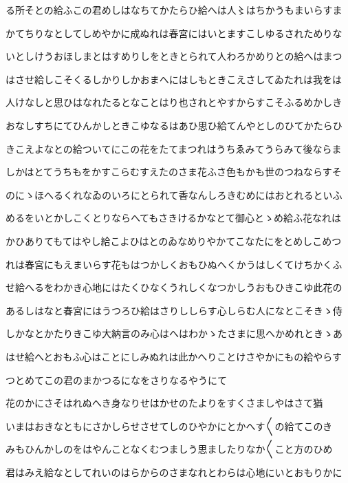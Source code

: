 \documentclass[a4paper,11pt,landscape]{ltjtarticle}
\begin{document}
\par\medskip
る所そとの給ふこの君めしはなちてかたらひ給へは人〻はちかうもまいらすま
\par\medskip
かてちりなとしてしめやかに成ぬれは春宮にはいとますこしゆるされためりな
\par\medskip
いとしけうおほしまとはすめりしをときとられて人わろかめりとの給へはまつ
\par\medskip
はさせ給しこそくるしかりしかおまへにはしもときこえさしてゐたれは我をは
\par\medskip
人けなしと思ひはなれたるとなことはり也されとやすからすこそふるめかしき
\par\medskip
おなしすちにてひんかしときこゆなるはあひ思ひ給てんやとしのひてかたらひ
\par\medskip
きこえよなとの給ついてにこの花をたてまつれはうちゑみてうらみて後ならま
\par\medskip
しかはとてうちもをかすこらむすえたのさま花ふさ色もかも世のつねならすそ
\par\medskip
のにゝほへるくれなゐのいろにとられて香なんしろきむめにはおとれるといふ
\par\medskip
めるをいとかしこくとりならへてもさきけるかなとて御心とゝめ給ふ花なれは
\par\medskip
かひありてもてはやし給こよひはとのゐなめりやかてこなたにをとめしこめつ
\par\medskip
れは春宮にもえまいらす花もはつかしくおもひぬへくかうはしくてけちかくふ
\par\medskip
せ給へるをわかき心地にはたくひなくうれしくなつかしうおもひきこゆ此花の
\par\medskip
あるしはなと春宮にはうつろひ給はさりししらす心しらむ人になとこそきゝ侍
\par\medskip
しかなとかたりきこゆ大納言のみ心はへはわかゝたさまに思へかめれときゝあ
\par\medskip
はせ給へとおもふ心はことにしみぬれは此かへりことけさやかにもの給やらす
\par\medskip
つとめてこの君のまかつるになをさりなるやうにて
\par\medskip
花のかにさそはれぬへき身なりせはかせのたよりをすくさましやはさて猶
\par\medskip
いまはおきなともにさかしらせさせてしのひやかにとかへす〱の給てこのき
\par\medskip
みもひんかしのをはやんことなくむつましう思ましたりなか〱こと方のひめ
\par\medskip
君はみえ給なとしてれいのはらからのさまなれとわらは心地にいとおもりかに
\par\medskip
\end{document}
